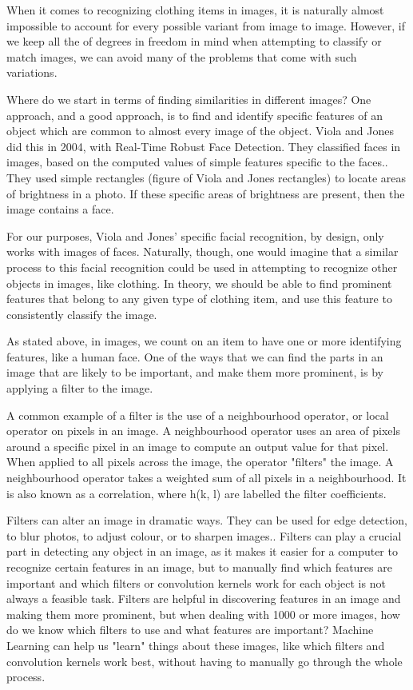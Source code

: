 \documentclass[12pt]{article} %
\begin{document}
	When it comes to recognizing clothing items in images, it is naturally almost impossible to account for every possible variant from image to image. However, if we keep all the of degrees in freedom in mind when attempting to classify or match images, we can avoid many of the problems that come with such variations. 

Where do we start in terms of finding similarities in different images? One approach, and a good approach, is to find and identify specific features of an object which are common to almost every image of the object. Viola and Jones did this in 2004, with Real-Time Robust Face Detection. They classified faces in images, based on the computed values of simple features specific to the faces.\cite{viola2004robust}. They used simple rectangles (figure of Viola and Jones rectangles) to locate areas of brightness in a photo. If these specific areas of brightness are present, then the image contains a face. 

For our purposes, Viola and Jones' specific facial recognition, by design, only works with images of faces. Naturally, though, one would imagine that a similar process to this facial recognition could be used in attempting to recognize other objects in images, like clothing. In theory, we should be able to find prominent features that belong to any given type of clothing item, and use this feature to consistently classify the image.
		
	 As stated above, in images, we count on an item to have one or more identifying features, like a human face. One of the ways that we can find the parts in an image that are likely to be important, and make them more prominent, is by applying a filter to the image. 

A common example of a filter is the use of a neighbourhood operator, or local operator on pixels in an image. A neighbourhood operator uses an area of pixels around a specific pixel in an image to compute an output value for that pixel. When applied to all pixels across the image, the operator "filters" the image. A neighbourhood operator takes a weighted sum of all pixels in a neighbourhood. It is also known as a correlation, where h(k, l) are labelled the filter coefficients. 
	
	Filters can alter an image in dramatic ways. They can be used for edge detection, to blur photos, to adjust colour, or to sharpen images.\cite{szeliski2010computer}. Filters can play a crucial part in detecting any object in an image, as it makes it easier for a computer to recognize certain features in an image, but to manually find which features are important and which filters or convolution kernels work for each object is not always a feasible task. Filters are helpful in discovering features in an image and making them more prominent, but when dealing with 1000 or more images, how do we know which filters to use and what features are important? Machine Learning can help us "learn" things about these images, like which filters and convolution kernels work best, without having to manually go through the whole process. 
\end{document}
